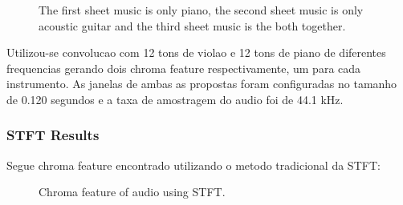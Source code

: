 \documentclass{article}
\begin{document}
	\begin{figure}[h]
	 \centerline{}
	 \centerline{}
	 \centerline{}
	 \caption{The first sheet music is only piano, the second sheet music is only acoustic guitar and the third sheet music is the both together.}
	 \label{fig:1-ssft}
	\end{figure}

Utilizou-se convolucao com 12 tons de violao e 12 tons de piano de diferentes frequencias gerando dois chroma feature respectivamente, um para cada instrumento. As janelas de ambas as propostas foram configuradas no tamanho de 0.120 segundos e a taxa de amostragem do audio foi de 44.1 kHz.

	\subsubsection{STFT Results}
	Segue chroma feature encontrado utilizando o metodo tradicional da STFT:
	
	\begin{figure}[h]
	 \centerline{}
	 \caption{Chroma feature of audio using STFT.}
	 \label{fig:2-ssft}
	\end{figure}	
\end{document}
